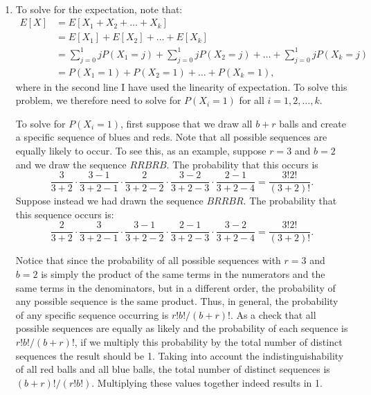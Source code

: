 \begin{problem}{5} $ $
\begin{enumerate}
\item To solve for the expectation, note that:
\begin{align*}
E[X] &= E[X_1+X_2+\ldots+X_k] \\
&= E[X_1]+E[X_2]+\ldots+E[X_k] \\
& = \sum_{j=0}^1 j P(X_1 = j)+\sum_{j=0}^1 j P(X_2 = j)+ \ldots+\sum_{j=0}^1 j P(X_k = j) \\
& = P(X_1 = 1)+ P(X_2 = 1)+ \ldots+P(X_k = 1),
\end{align*}
where in the second line I have used the linearity of expectation.  To solve this problem, we therefore need to solve for $P(X_i = 1)$ for all $i=1, 2, \ldots, k$.

To solve for $P(X_i = 1)$, first suppose that we draw all $b+r$ balls and create a specific sequence of blues and reds.  Note that all possible sequences are equally likely to occur. To see this, as an example, suppose $r=3$ and $b=2$ and we draw the sequence $RRBRB$.  The probability that this occurs is 
\begin{equation*}
\frac{3}{3+2}\cdot \frac{3-1}{3+2-1} \cdot \frac{2}{3+2-2} \cdot \frac{3-2}{3+2-3} \cdot \frac{2-1}{3+2-4} = \frac{3!2!}{(3+2)!}.
\end{equation*}
Suppose instead we had drawn the sequence $BRRBR$.  The probability that this sequence occurs is:
\begin{equation*}
\frac{2}{3+2}\cdot \frac{3}{3+2-1} \cdot \frac{3-1}{3+2-2} \cdot \frac{2-1}{3+2-3} \cdot \frac{3-2}{3+2-4} = \frac{3!2!}{(3+2)!}.
\end{equation*}

Notice that since the probability of all possible sequences with $r=3$ and $b=2$ is simply the product of the same terms in the numerators and the same terms in the denominators, but in a different order, the probability of any possible sequence is the same product.  Thus, in general, the probability of any specific sequence occurring is $r!b!/(b+r)!$.  As a check that all possible sequences are equally as likely and the probability of each sequence is $r!b!/(b+r)!$, if we multiply this probability by the total number of distinct sequences the result should be 1.  Taking into account the indistinguishability of all red balls and all blue balls, the total number of distinct sequences is $(b+r)!/(r!b!)$.  Multiplying these values together indeed results in 1.


\end{enumerate}
\end{problem}
